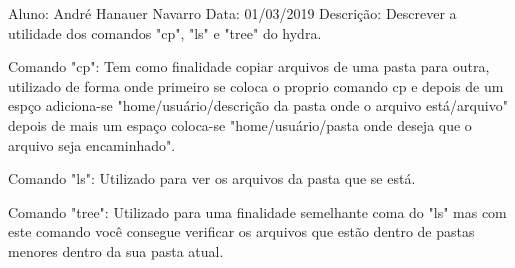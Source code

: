 Aluno: André Hanauer Navarro
Data: 01/03/2019
Descrição: Descrever a utilidade dos comandos "cp", "ls" e "tree" do hydra.

Comando "cp": Tem como finalidade copiar arquivos de uma pasta para outra, utilizado de forma onde primeiro se coloca o proprio comando cp e depois de um espço adiciona-se "home/usuário/descrição da pasta onde o arquivo está/arquivo" depois de mais um espaço coloca-se "home/usuário/pasta onde deseja que o arquivo seja encaminhado".

Comando "ls": Utilizado para ver os arquivos da pasta que se está.

Comando "tree": Utilizado para uma finalidade semelhante coma do "ls" mas com este comando você consegue verificar  os arquivos que estão dentro de pastas menores dentro da sua pasta atual.
